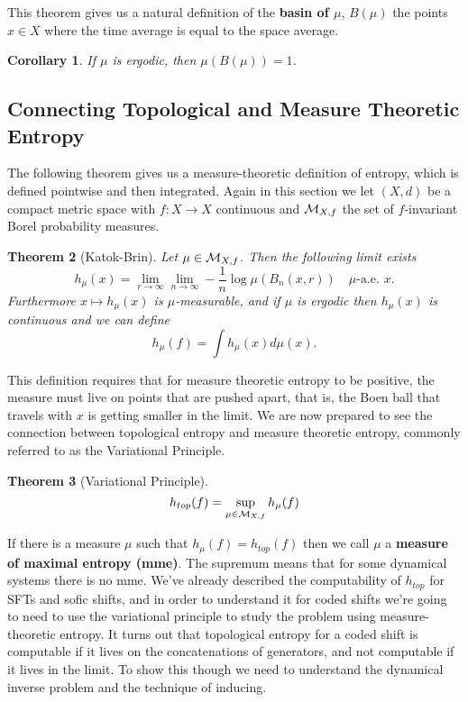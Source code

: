 \documentclass[11pt, reqno]{amsart}
\theoremstyle{plain}
\newtheorem{thm}{Theorem}[section]
\newtheorem{cor}[thm]{Corollary}
\theoremstyle{definition}
\begin{document}
This theorem gives us a natural definition of the \textbf{basin of $\mu$}, $B(\mu)$ the points $x \in X$ where the time average is equal to the space average. 
\begin{cor}
  If $\mu$ is ergodic, then $\mu(B(\mu)) = 1$.
\end{cor}

\subsection{Connecting Topological and Measure Theoretic Entropy}\cite[L10, L11]{wolf}
The following theorem gives us a measure-theoretic definition of entropy, which is defined pointwise and then integrated. Again in this section we let $(X,d)$ be a compact metric space with $f: X \rightarrow X$ continuous and $\mathcal{M}_{X,f}$ the set of $f$-invariant Borel probability measures. 
\begin{thm}[Katok-Brin]
  Let $\mu \in \mathcal{M}_{X,f}$. Then the following limit exists 
  $$h_\mu(x) = \lim_{r \rightarrow \infty} \lim_{n \rightarrow \infty} - \frac{1}{n} \log \mu(B_n(x, r)) \quad \mu\text{-a.e. } x.$$
  Furthermore $x \mapsto h_\mu(x)$ is $\mu$-measurable, and if $\mu$ is ergodic then $h_\mu(x)$ is continuous and we can define 
  $$h_\mu(f) = \int h_\mu(x)d\mu(x).$$
\end{thm}
This definition requires that for measure theoretic entropy to be positive, the measure must live on points that are pushed apart, that is, the Boen ball that travels with $x$ is getting smaller in the limit. We are now prepared to see the connection between topological entropy and measure theoretic entropy, commonly referred to as the Variational Principle.

\begin{thm}[Variational Principle]
  $$h_{top}(f)= \sup_{\mu \in \mathcal{M}_{X,f}}h_\mu(f)$$
\end{thm}

If there is a measure $\mu$ such that $h_\mu(f) = h_{top}(f)$ then we call $\mu$ a \textbf{measure of maximal entropy (mme)}. The supremum means that for some dynamical systems there is no mme. We've already described the computability of $h_{top}$ for SFTs and sofic shifts, and in order to understand it for coded shifts we're going to need to use the variational principle to study the problem using measure-theoretic entropy. It turns out that topological entropy for a coded shift is computable if it lives on the concatenations of generators, and not computable if it lives in the limit. To show this though we need to understand the dynamical inverse problem and the technique of inducing.
\end{document}
